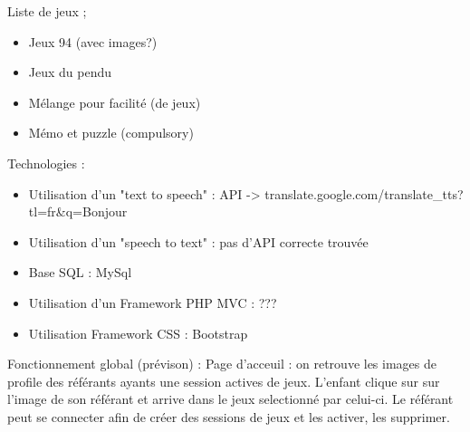 \documentclass[12pt,a4paper]{report}
\begin{document}
Liste de jeux ;
\begin{itemize}
\item Jeux 94 (avec images?)
\item Jeux du pendu
\item Mélange pour facilité (de jeux)
\item Mémo et puzzle (compulsory)
\end{itemize}

Technologies :
\begin{itemize}
\item Utilisation d'un "text to speech" : API -> translate.google.com/translate_tts?tl=fr&q=Bonjour
\item Utilisation d'un "speech to text" : pas d'API correcte trouvée
\item Base SQL : MySql
\item Utilisation d'un Framework PHP MVC : ???
\item Utilisation Framework CSS : Bootstrap
\end{itemize}

Fonctionnement global (prévison) :
Page d'acceuil : on retrouve les images de profile des référants ayants une session actives de jeux. 
L'enfant clique sur sur l'image de son référant et arrive dans le jeux selectionné par celui-ci.
Le référant peut se connecter afin de créer des sessions de jeux et les activer, les supprimer.




\end{document}
